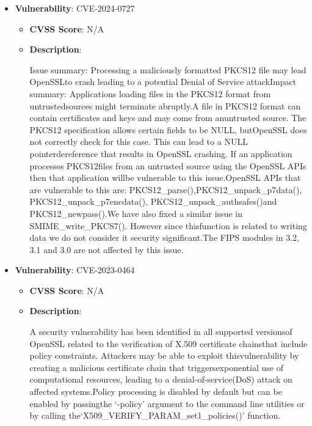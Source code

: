 \documentclass{article}
\begin{document}
\begin{itemize}
        \item \textbf{Vulnerability}: CVE-2024-0727
        \begin{itemize}
            \item \textbf{CVSS Score}:  N/A 
            \item \textbf{Description}:
            \parbox[t]{0.9\linewidth}{
                \ttfamily Issue summary: Processing a maliciously formatted PKCS12 file may lead OpenSSLto crash leading to a potential Denial of Service attackImpact summary: Applications loading files in the PKCS12 format from untrustedsources might terminate abruptly.A file in PKCS12 format can contain certificates and keys and may come from anuntrusted source. The PKCS12 specification allows certain fields to be NULL, butOpenSSL does not correctly check for this case. This can lead to a NULL pointerdereference that results in OpenSSL crashing. If an application processes PKCS12files from an untrusted source using the OpenSSL APIs then that application willbe vulnerable to this issue.OpenSSL APIs that are vulnerable to this are: PKCS12\_parse(),PKCS12\_unpack\_p7data(), PKCS12\_unpack\_p7encdata(), PKCS12\_unpack\_authsafes()and PKCS12\_newpass().We have also fixed a similar issue in SMIME\_write\_PKCS7(). However since thisfunction is related to writing data we do not consider it security significant.The FIPS modules in 3.2, 3.1 and 3.0 are not affected by this issue.
            }
        \end{itemize}
    
        \item \textbf{Vulnerability}: CVE-2023-0464
        \begin{itemize}
            \item \textbf{CVSS Score}:  N/A 
            \item \textbf{Description}:
            \parbox[t]{0.9\linewidth}{
                \ttfamily A security vulnerability has been identified in all supported versionsof OpenSSL related to the verification of X.509 certificate chainsthat include policy constraints.  Attackers may be able to exploit thisvulnerability by creating a malicious certificate chain that triggersexponential use of computational resources, leading to a denial-of-service(DoS) attack on affected systems.Policy processing is disabled by default but can be enabled by passingthe `-policy' argument to the command line utilities or by calling the`X509\_VERIFY\_PARAM\_set1\_policies()' function.
            }
        \end{itemize}
    

\end{itemize}
\end{document}
